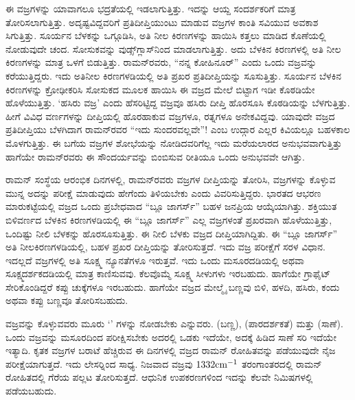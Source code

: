 ಈ ವಜ್ರಗಳನ್ನು ಯಾವಾಗಲೂ ಭದ್ರತೆಯಲ್ಲಿ ಇಡಲಾಗುತ್ತಿತ್ತು. ಇದನ್ನು ಆಯ್ದ ಸಂದರ್ಶಕರಿಗೆ ಮಾತ್ರ ತೋರಿಸಲಾಗುತ್ತಿತ್ತು. ಅದೃಷ್ಟವಿದ್ದವರಿಗೆ ಪ್ರತಿದೀಪ್ತಿಯುಂಟು ಮಾಡುವ ವಜ್ರಗಳ ಕಾಂತಿ ಸವಿಯುವ ಅವಕಾಶ ಸಿಗುತ್ತಿತ್ತು. ಸೂರ್ಯನ ಬೆಳಕನ್ನು ಒಗ್ಗೂಡಿಸಿ, ಅತಿ ನೀಲ ಕಿರಣಗಳನ್ನು ಹಾಯಿಸಿ ಕತ್ತಲು ಮಾಡಿದ ಕೊಣೆಯಲ್ಲಿ ನೋಡುವುದೇ ಚಂದ. ಸೋಸುಕವನ್ನು ವುಡ್ಸ್‌ಗ್ಲಾಸ್‍ನಿಂದ ಮಾಡಲಾಗುತ್ತಿತ್ತು. ಅದು ಬೆಳಕಿನ ಕಿರಣಗಳಲ್ಲಿ ಅತಿ ನೀಲ ಕಿರಣಗಳನ್ನು ಮಾತ್ರ ಒಳಗೆ ಬಿಡುತ್ತಿತ್ತು. ರಾಮನ್‍ರವರು, “ನನ್ನ ಕೋಹಿನೂರ್” ಎಂದು ಒಂದು ವಜ್ರವನ್ನು ಕರೆಯುತ್ತಿದ್ದರು. ಇದು ಅತಿನೀಲ ಕಿರಣಗಳಡಿಯಲ್ಲಿ ಅತಿ ಪ್ರಖರ ಪ್ರತಿದೀಪ್ತಿಯನ್ನು ಸೂಸುತ್ತಿತ್ತು. ಸೂರ್ಯನ ಬೆಳಕಿನ ಕಿರಣಗಳನ್ನು ಕ್ರೋಢೀಕರಿಸಿ ಸೋಸುಕದ ಮೂಲಕ ಹಾಯಿಸಿ ಈ ವಜ್ರದ ಮೇಲೆ ಬಿಟ್ಟಾಗ ಇಡೀ ಕೊಠಡಿಯೇ ಹೊಳೆಯುತ್ತಿತ್ತು. ‘ಹಸಿರು ವಜ್ರ’ ಎಂದು ಹೆಸರಿಟ್ಟಿದ್ದ ವಜ್ರವೂ ಹಸಿರು ದೀಪ್ತಿ ಹೊರಸೂಸಿ ಕೊಠಡಿಯನ್ನು ಬೆಳಗುತ್ತಿತ್ತು. ಹೀಗೆ ವಿವಿಧ ವರ್ಣಗಳನ್ನು ದೀಪ್ತಿಯಲ್ಲಿ ಹೊರಹಾಕುವ ವಜ್ರಗಳೂ, ರತ್ನಗಳೂ ಅನೇಕವಿದ್ದವು. ಯಾವುದೇ ವಜ್ರದ ಪ್ರತಿದೀಪ್ತಿಯು ಬೆಳಗಿದಾಗ ರಾಮನ್‍ರವರ “ಇದು ಸುಂದರವಲ್ಲವೇ”! ಎಂಬ ಉದ್ಗಾರ ಎಲ್ಲರ ಕಿವಿಯಲ್ಲೂ ಬಹಳಕಾಲ ಮೊಳಗುತ್ತಿತ್ತು. ಈ ಬಗೆಯ ವಜ್ರಗಳ ಶೋಭೆಯನ್ನು ನೋಡಿದವರಿಗೆಲ್ಲ ಇದು ಮರೆಯಲಾರದ ಅನುಭವವಾಗುತ್ತಿತ್ತು ಹಾಗೆಯೇ ರಾಮನ್‍ರವರು ಈ ಸೌಂದರ್ಯವನ್ನು ಬಿಂಬಿಸುವ ರೀತಿಯೂ ಒಂದು ಅನುಭವವೇ ಆಗಿತ್ತು.

ರಾಮನ್ ಸಂಸ್ಥೆಯ ಆರಂಭಿಕ ದಿನಗಳಲ್ಲಿ, ರಾಮನ್‍ರವರು ವಜ್ರಗಳ ದೀಪ್ತಿಯನ್ನು ತೋರಿಸಿ, ವಜ್ರಗಳನ್ನು ಕೊಳ್ಳುವ ಮುನ್ನ ಅದನ್ನು ಪರೀಕ್ಷೆ ಮಾಡುವುದು ಹೇಗೆಂದು ತಿಳಿಯಬೇಕು ಎಂದು ವಿವರಿಸುತ್ತಿದ್ದರು. ಭಾರತದ ಆಭರಣ ಮಾರುಕಟ್ಟೆಯಲ್ಲಿ ವಜ್ರದ ಒಂದು ಪ್ರಬೇಧವಾದ “ಬ್ಲೂ ಜಾಗರ್ಸ್” ಬಹಳ ಜನಪ್ರಿಯ ಆಯ್ಕೆಯಾಗಿತ್ತು. ಶಕ್ತಿಯುತ ಬಿಳಿವರ್ಣದ ಬೆಳಕಿನ ಕಿರಣಗಳಡಿಯಲ್ಲಿ ಈ “ಬ್ಲೂ ಜಾಗರ್ಸ್” ಎಲ್ಲ ವಜ್ರಗಳಂತೆ ಪ್ರಖರವಾಗಿ ಹೊಳೆಯುತ್ತಿತ್ತು, ಒಂದಿಷ್ಟು ನೀಲಿ ಬೆಳಕನ್ನು ಹೊರಸೂಸುತ್ತಿತ್ತು. ಈ ನೀಲಿ ಬೆಳಕು ವಜ್ರದ ದೀಪ್ತಿಯಾಗಿದ್ದಿತು. ಈ “ಬ್ಲೂ ಜಾಗರ್ಸ್” ಅತಿ ನೀಲಕಿರಣಗಳಡಿಯಲ್ಲಿ, ಬಹಳ ಪ್ರಖರ ದೀಪ್ತಿಯನ್ನು ತೋರಿಸುತ್ತದೆ. ಇದು ವಜ್ರ ಪರೀಕ್ಷೆಗೆ ಸರಳ ವಿಧಾನ. ಇದಲ್ಲದೆ ವಜ್ರಗಳಲ್ಲಿ ಅತಿ ಸೂಕ್ಷ್ಮ ನ್ಯೂನತೆಗಳೂ ಇರುತ್ತವೆ. ಇದು ಒಂದು ಮಸೂರದಡಿಯಲ್ಲಿ ಅಥವಾ ಸೂಕ್ಷ್ಮದರ್ಶಕದಡಿಯಲ್ಲಿ ಮಾತ್ರ ಕಾಣಿಸುವವು. ಕೆಲವೊಮ್ಮೆ ಸೂಕ್ಷ್ಮ ಸೀಳುಗಳು ಇರಬಹುದು. ಹಾಗೆಯೇ ಗ್ರಾಫೈಟ್ ಸೇರಿಕೊಂಡಿದ್ದರೆ ಕಪ್ಪು ಚುಕ್ಕೆಗಳೂ ಇರಬಹುದು. ಹಾಗೆಯೇ ವಜ್ರದ ಮೇಲ್ಮೈ ಬಣ್ಣವು ಬಿಳಿ, ಹಳದಿ, ಹಸಿರು, ಕಂದು ಅಥವಾ ಕಪ್ಪು ಬಣ್ಣವೂ ತೋರಿಸಬಹುದು.

ವಜ್ರವನ್ನು ಕೊಳ್ಳುವವರು ಮೂರು ‘’ ಗಳನ್ನು ನೋಡಬೇಕು ಎನ್ನುವರು.  (ಬಣ್ಣ),  (ಪಾರದರ್ಶಕತೆ) ಮತ್ತು  (ಸಾಣೆ). ಒಂದು ವಜ್ರವನ್ನು  ಮಸೂರದಿಂದ ಪರೀಕ್ಷಿಸಬೇಕು ಅದರಲ್ಲಿ ಒಡಕು ಇದೆಯೇ, ಅದಕ್ಕೆ ಹಿಡಿದ ಸಾಣೆ ಸರಿ ಇದೆಯೇ ಇತ್ಯಾದಿ. ಕೃತಕ ವಜ್ರಗಳ ಬರಾಟೆ ಹೆಚ್ಚಿರುವ ಈ ದಿನಗಳಲ್ಲಿ ವಜ್ರದ ರಾಮನ್ ರೋಹಿತವನ್ನು ಪಡೆಯುವುದೇ ನೈಜ ಪರೀಕ್ಷೆಯಾಗುತ್ತದೆ. ಇದು ಲೇಸರ್‍ನಿಂದ ಸಾಧ್ಯ. ನಿಜವಾದ ವಜ್ರವು $1332 {\rm cm}^{-1}$ ತರಂಗಾಂತರದಲ್ಲಿ ರಾಮನ್ ರೋಹಿತದಲ್ಲಿ ಗೆರೆಯ ಪಲ್ಲಟ ತೋರಿಸುತ್ತದೆ. ಆಧುನಿಕ ಉಪಕರಣಗಳಿಂದ ಇದನ್ನು ಕೆಲವೇ ನಿಮಿಷಗಳಲ್ಲಿ ಪಡೆಯಬಹುದು.

